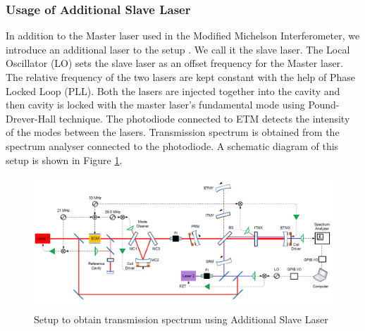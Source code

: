 \documentclass[colorlinks=true,pdfstartview=FitV,linkcolor=blue,
            citecolor=red,urlcolor=magenta]{ligodoc}
\begin{document}
\subsubsection{Usage of Additional Slave Laser }
In addition to the Master laser used in the Modified Michelson Interferometer, we introduce an additional laser to the setup \cite{alberto}. We call it the slave laser. The Local Oscillator (LO) sets the slave laser as an offset frequency for the Master laser. The relative frequency of the two lasers are kept constant with the help of Phase Locked Loop (PLL). Both the lasers are injected together into the cavity and then cavity is locked with the master laser’s fundamental mode using Pound-Drever-Hall technique. The photodiode connected to ETM detects the intensity of the modes between the lasers. Transmission spectrum is obtained from the spectrum analyser connected to the photodiode. A schematic diagram of this setup is shown in Figure \ref{fig:asl}.
\vspace{5mm}
 \begin{figure}[htbp]
\begin{center}
\includegraphics[width=7in]{asl}
\caption{Setup to obtain transmission spectrum using Additional Slave Laser}
\label{fig:asl}
\end{center}
\end{figure}
\end{document}
